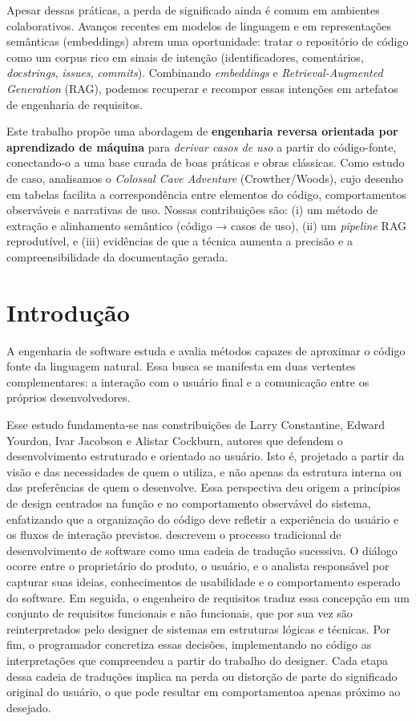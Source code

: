 \documentclass[12pt,a4paper]{article}
\begin{document}
Apesar dessas práticas, a perda de significado ainda é comum em ambientes colaborativos. Avanços recentes em modelos de linguagem e em representações semânticas (embeddings) abrem uma oportunidade: tratar o repositório de código como um corpus rico em sinais de intenção (identificadores, comentários, \emph{docstrings}, \emph{issues}, \emph{commits}). Combinando \emph{embeddings} e \emph{Retrieval-Augmented Generation} (RAG), podemos recuperar e recompor essas intenções em artefatos de engenharia de requisitos.

Este trabalho propõe uma abordagem de \textbf{engenharia reversa orientada por aprendizado de máquina} para \emph{derivar casos de uso} a partir do código-fonte, conectando-o a uma base curada de boas práticas e obras clássicas. Como estudo de caso, analisamos o \emph{Colossal Cave Adventure} (Crowther/Woods), cujo desenho em tabelas facilita a correspondência entre elementos do código, comportamentos observáveis e narrativas de uso. Nossas contribuições são: (i) um método de extração e alinhamento semântico (código → casos de uso), (ii) um \emph{pipeline} RAG reprodutível, e (iii) evidências de que a técnica aumenta a precisão e a compreensibilidade da documentação gerada.


\section{Introdução}

A engenharia de software estuda e avalia métodos capazes de aproximar o código fonte da linguagem natural. Essa busca se manifesta em duas vertentes complementares: a interação com o usuário final e a comunicação entre os próprios desenvolvedores.

Esse estudo fundamenta-se nas constribuições de Larry Constantine, Edward Yourdon, Ivar Jacobson e Alistar Cockburn, autores que defendem o desenvolvimento estruturado e orientado ao usuário. Isto é, projetado a partir da visão e das necessidades de quem o utiliza, e não apenas da estrutura interna ou das preferências de quem o desenvolve. Essa perspectiva deu origem a princípios de design centrados na função e no comportamento observável do sistema, enfatizando que a organização do código deve refletir a experiência do usuário e os fluxos de interação previstos. \textcite{yourdon1979structured} descrevem o processo tradicional de desenvolvimento de software como uma cadeia de tradução sucessiva. O diálogo ocorre entre o proprietário do produto, o usuário, e o analista responsável por capturar suas ideias, conhecimentos de usabilidade e o comportamento esperado do software. Em seguida, o engenheiro de requisitos traduz essa concepção em um conjunto de requisitos funcionais e não funcionais, que por sua vez são reinterpretados pelo designer de sistemas em estruturas lógicas e técnicas. Por fim, o programador concretiza essas decisões, implementando no código as interpretações que compreendeu a partir do trabalho do designer. Cada etapa dessa cadeia de traduções implica na perda ou distorção de parte do significado original do usuário, o que pode resultar em comportamentoa apenas próximo ao desejado.
\end{document}
